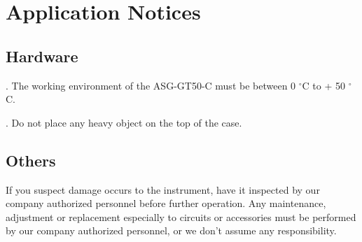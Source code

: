 \chapter{\heiti Application Notices}
\section{\heiti Hardware}
. The working environment of the ASG-GT50-C must be between 0  $^{\circ}$C  to + 50  $^{\circ}$C.

. Do not place any heavy object on the top of the case.




%

\section{\heiti Others}
 \hspace{-0.2cm}If you suspect damage occurs to the instrument, have it inspected by our company authorized personnel before further operation. Any maintenance, adjustment or replacement especially to circuits or accessories must be performed by our company authorized personnel, or we don't assume any responsibility.



